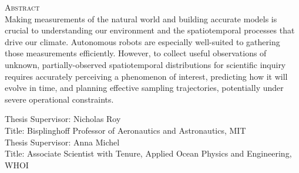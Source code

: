     \begin{singlespace}
    {\parindent0pt 
        {\large \textsc{Abstract}} \\ %
    









        Making measurements of the natural world and building accurate models is crucial to understanding our environment and the spatiotemporal processes that drive our climate. 
        Autonomous robots are especially well-suited to gathering those measurements efficiently. 
        However, to collect useful observations of unknown, partially-observed spatiotemporal distributions for scientific inquiry requires accurately perceiving a phenomenon of interest, predicting how it will evolve in time, and planning effective sampling trajectories, potentially under severe operational constraints. \\

    }
    
        \noindent Thesis Supervisor: Nicholas Roy \\
        \noindent Title: Bisplinghoff Professor of Aeronautics and Astronautics, MIT \\

        \noindent Thesis Supervisor: Anna Michel \\
        \noindent Title: Associate Scientist with Tenure, Applied Ocean Physics and Engineering, WHOI

    \end{singlespace}
    
    \newpage
    \null
    \thispagestyle{empty}
    \newpage

